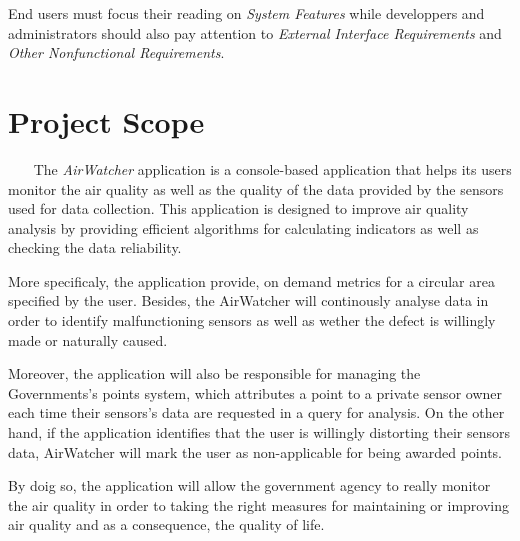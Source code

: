 \documentclass{report}
\begin{document}
End users must focus their reading on \textit{System Features} while developpers
and administrators should also pay attention to \textit{External Interface
Requirements} and \textit{Other Nonfunctional Requirements}.


\section{Project Scope} ~~~
The \textit{AirWatcher} application is a console-based application that helps
its users monitor the air quality as well as the quality of the data provided by
the sensors used for data collection. This application is designed to improve
air quality analysis by providing efficient algorithms for calculating indicators
as well as checking the data reliability.

More specificaly, the application provide, on demand metrics for a circular area
specified by the user. Besides, the AirWatcher will continously analyse data in
order to identify malfunctioning sensors as well as wether the defect is willingly
made or naturally caused.

Moreover, the application will also be responsible for managing the Governments's
points system, which attributes a point to a private sensor owner each time their
sensors's data are requested in a query for analysis. On the other hand, if the
application identifies that the user is willingly distorting their sensors data,
AirWatcher will mark the user as non-applicable for being awarded points.

By doig so, the application will allow the government agency to really monitor
the air quality in order to taking the right measures for maintaining or
improving air quality and as a consequence, the quality of life.

\end{document}
